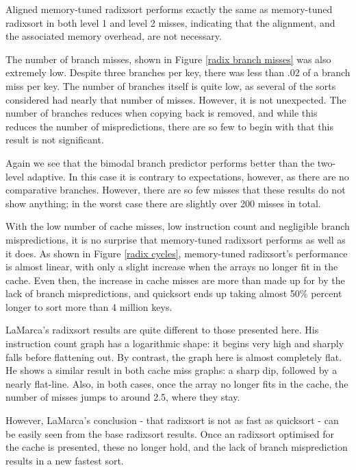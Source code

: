 Aligned memory-tuned radixsort performs exactly the same as memory-tuned radixsort in both
level 1 and level 2 misses, indicating that the alignment, and the associated
memory overhead, are not necessary.

The number of branch misses, shown in Figure \ref{radix branch misses} was also
extremely low. Despite three branches per key, there was less than .02 of a branch
miss per key. The number of branches itself is quite low, as several of the
sorts considered had nearly that number of misses. However, it is not
unexpected. The number of branches reduces when copying back is removed, and
while this reduces the number of mispredictions, there are so few to begin with
that this result is not significant.

Again we see that the bimodal branch predictor performs better than the
two-level adaptive. In this case it is contrary to expectations, however, as
there are no comparative branches. However, there are so few misses that these
results do not show anything; in the worst case there are slightly over 200
misses in total.

With the low number of cache misses, low instruction count and negligible branch
mispredictions, it is no surprise that memory-tuned radixsort performs as well as it
does. As shown in Figure \ref{radix cycles}, memory-tuned radixsort's performance is
almost linear, with only a slight increase when the arrays no longer fit in the
cache.  Even then, the increase in cache misses are more than made up for by the
lack of branch mispredictions, and quicksort ends up taking almost 50\% percent
longer to sort more than 4 million keys.

LaMarca's radixsort results are quite different to those presented here. His
instruction count graph has a logarithmic shape: it begins very high and sharply
falls before flattening out. By contrast, the graph here is almost completely
flat. He shows a similar result in both cache miss graphs: a sharp dip, followed
by a nearly flat-line. Also, in both cases, once the array no longer fits in the
cache, the number of misses jumps to around 2.5, where they stay.

However, LaMarca's conclusion - that radixsort is not as fast as quicksort - can
be easily seen from the base radixsort results. Once an radixsort optimised for
the cache is presented, these no longer hold, and the lack of branch
misprediction results in a new fastest sort.

